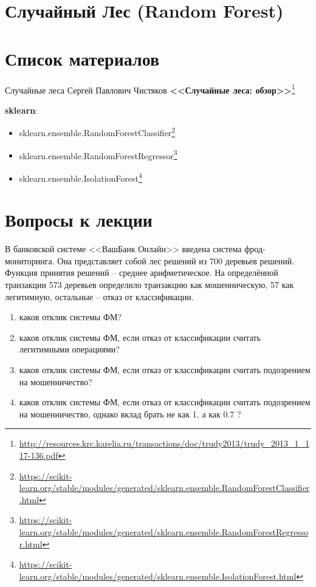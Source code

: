 \documentclass{beamer}
\begin{document}
\section{Случайный Лес (Random Forest)}\label{section:random_forest}

\begin{frame}
	
\end{frame}
  
\section{Список материалов}
  
  \begin{frame}{Случайные леса}
  Сергей Павлович Чистяков \textbf{<<Случайные леса: обзор>>}\footnote{\tiny
\url{http://resources.krc.karelia.ru/transactions/doc/trudy2013/trudy_2013_1_117-136.pdf}
}

	\textbf{sklearn}:
	\begin{itemize}
		\item sklearn.ensemble.RandomForestClassifier\footnote{
			\tiny \url{https://scikit-learn.org/stable/modules/generated/sklearn.ensemble.RandomForestClassifier.html}
		}
		\item sklearn.ensemble.RandomForestRegressor\footnote{
			\tiny
			\url{https://scikit-learn.org/stable/modules/generated/sklearn.ensemble.RandomForestRegressor.html}
		}
	    \item sklearn.ensemble.IsolationForest\footnote{
	       \tiny
	       \url{https://scikit-learn.org/stable/modules/generated/sklearn.ensemble.IsolationForest.html}
    	}
	\end{itemize}
  \end{frame}
  
  \section{Вопросы к лекции}
  
  \begin{frame}
  В банковской системе <<ВашБанк Онлайн>> введена система фрод-мониторинга. 
  Она представляет собой лес решений из 700 деревьев решений. Функция принятия решений -- среднее арифметическое. На определённой транзакции 573 деревьев определило транзакцию как мошенническую, 57 как легитимную, остальные -- отказ от классификации.
  \begin{enumerate}
     \item каков отклик системы ФМ?
     \item каков отклик системы ФМ, если отказ от классификации считать легитимными операциями?
     \item каков отклик системы ФМ, если отказ от классификации считать подозрением на мошенничество?
     \item каков отклик системы ФМ, если отказ от классификации считать подозрением на мошенничество, однако вклад брать не как 1, а как 0.7 ?
  \end{enumerate}
  
  \end{frame}
\end{document}
